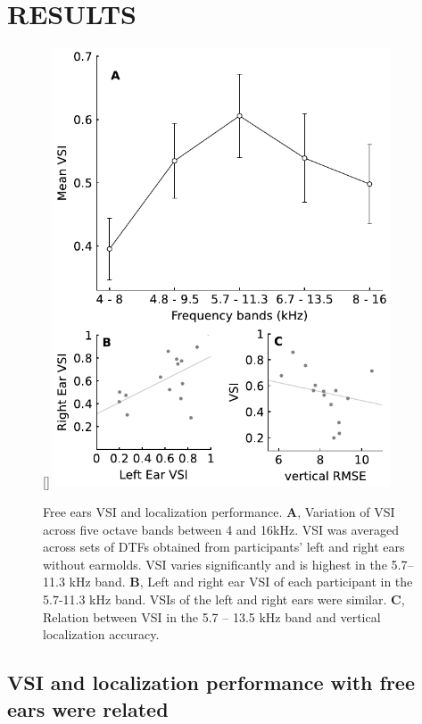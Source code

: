 \section{RESULTS}\label{sec3}%
\begin{figure}
\captionsetup{width=10cm}
\centering
    \raisebox{0pt}[\dimexpr{}\baselineskip\relax]{
        \includegraphics[width=10cm]{../Results/figures/fig2/fig2}}
	\caption{Free ears VSI and localization performance. \textbf{A}, Variation of VSI across five octave bands between 4 and 16kHz. VSI was averaged across sets of DTFs obtained from participants' left and right ears without earmolds. VSI varies significantly and is highest in the 5.7–11.3 kHz band.  \textbf{B}, Left and right ear VSI of each participant in the 5.7-11.3 kHz band. VSIs of the left and right ears were similar. \textbf{C}, Relation between VSI in the 5.7 – 13.5 kHz band and vertical localization accuracy.}
	\label{fig:ef_vsi}
\end{figure}
\noindent\vspace{-3\baselineskip}

\subsection{VSI and localization performance with free ears were related}


